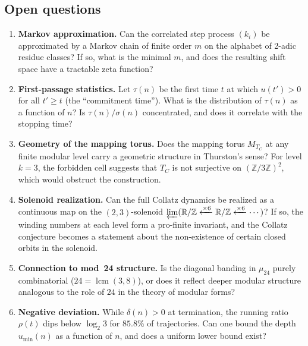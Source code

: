 \documentclass[11pt,a4paper]{article}
\newcommand{\Z}{\mathbb{Z}}
\newcommand{\R}{\mathbb{R}}
\DeclareMathOperator{\lcm}{lcm}
\theoremstyle{plain}
\theoremstyle{definition}
\begin{document}
\subsection{Open questions}

\begin{enumerate}
    \item \textbf{Markov approximation.} Can the correlated step process $(k_i)$ be approximated by a Markov chain of finite order $m$ on the alphabet of 2-adic residue classes? If so, what is the minimal $m$, and does the resulting shift space have a tractable zeta function?

    \item \textbf{First-passage statistics.} Let $\tau(n)$ be the first time $t$ at which $u(t') > 0$ for all $t' \geq t$ (the ``commitment time''). What is the distribution of $\tau(n)$ as a function of $n$? Is $\tau(n)/\sigma(n)$ concentrated, and does it correlate with the stopping time?

    \item \textbf{Geometry of the mapping torus.} Does the mapping torus $M_{T_C}$ at any finite modular level carry a geometric structure in Thurston's sense? For level $k = 3$, the forbidden cell suggests that $T_C$ is not surjective on $(\Z/3\Z)^2$, which would obstruct the construction.

    \item \textbf{Solenoid realization.} Can the full Collatz dynamics be realized as a continuous map on the $(2,3)$-solenoid $\varprojlim(\R/\Z \xleftarrow{\times 6} \R/\Z \xleftarrow{\times 6} \cdots)$? If so, the winding numbers at each level form a pro-finite invariant, and the Collatz conjecture becomes a statement about the non-existence of certain closed orbits in the solenoid.

    \item \textbf{Connection to mod~24 structure.} Is the diagonal banding in $\mu_{24}$ purely combinatorial ($24 = \lcm(3, 8)$), or does it reflect deeper modular structure analogous to the role of $24$ in the theory of modular forms?

    \item \textbf{Negative deviation.} While $\delta(n) > 0$ at termination, the running ratio $\rho(t)$ dips below $\log_2 3$ for $85.8\%$ of trajectories. Can one bound the depth $u_{\min}(n)$ as a function of $n$, and does a uniform lower bound exist?
\end{enumerate}


\end{document}
